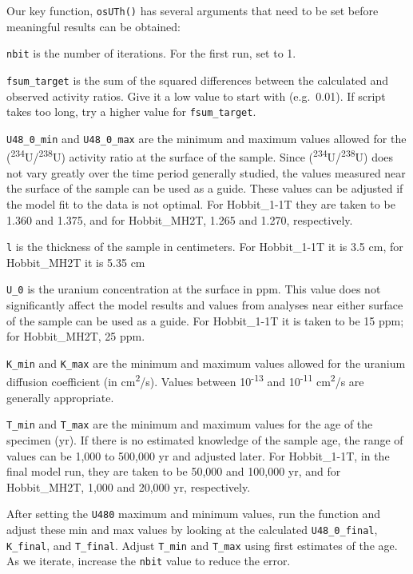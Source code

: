 \documentclass[]{elsarticle} %
\begin{document}
Our key function, \texttt{osUTh()} has several arguments that need to be set before meaningful results can be obtained:

\texttt{nbit} is the number of iterations. For the first run, set to 1.

\texttt{fsum\_target} is the sum of the squared differences between the calculated and observed activity ratios. Give it a low value to start with (e.g.~0.01). If script takes too long, try a higher value for \texttt{fsum\_target}.

\texttt{U48\_0\_min} and \texttt{U48\_0\_max} are the minimum and maximum values allowed for the (\textsuperscript{234}U/\textsuperscript{238}U) activity ratio at the surface of the sample. Since (\textsuperscript{234}U/\textsuperscript{238}U) does not vary greatly over the time period generally studied, the values measured near the surface of the sample can be used as a guide. These values can be adjusted if the model fit to the data is not optimal. For Hobbit\_1-1T they are taken to be 1.360 and 1.375, and for Hobbit\_MH2T, 1.265 and 1.270, respectively.

\texttt{l} is the thickness of the sample in centimeters. For Hobbit\_1-1T it is 3.5 cm, for Hobbit\_MH2T it is 5.35 cm

\texttt{U\_0} is the uranium concentration at the surface in ppm. This value does not significantly affect the model results and values from analyses near either surface of the sample can be used as a guide. For Hobbit\_1-1T it is taken to be 15 ppm; for Hobbit\_MH2T, 25 ppm.

\texttt{K\_min} and \texttt{K\_max} are the minimum and maximum values allowed for the uranium diffusion coefficient (in cm\textsuperscript{2}/s). Values between 10\textsuperscript{-13} and 10\textsuperscript{-11} cm\textsuperscript{2}/s are generally appropriate.

\texttt{T\_min} and \texttt{T\_max} are the minimum and maximum values for the age of the specimen (yr). If there is no estimated knowledge of the sample age, the range of values can be 1,000 to 500,000 yr and adjusted later. For Hobbit\_1-1T, in the final model run, they are taken to be 50,000 and 100,000 yr, and for Hobbit\_MH2T, 1,000 and 20,000 yr, respectively.

After setting the \texttt{U480} maximum and minimum values, run the function and adjust these min and max values by looking at the calculated \texttt{U48\_0\_final}, \texttt{K\_final}, and \texttt{T\_final}. Adjust \texttt{T\_min} and \texttt{T\_max} using first estimates of the age. As we iterate, increase the \texttt{nbit} value to reduce the error.
\end{document}
